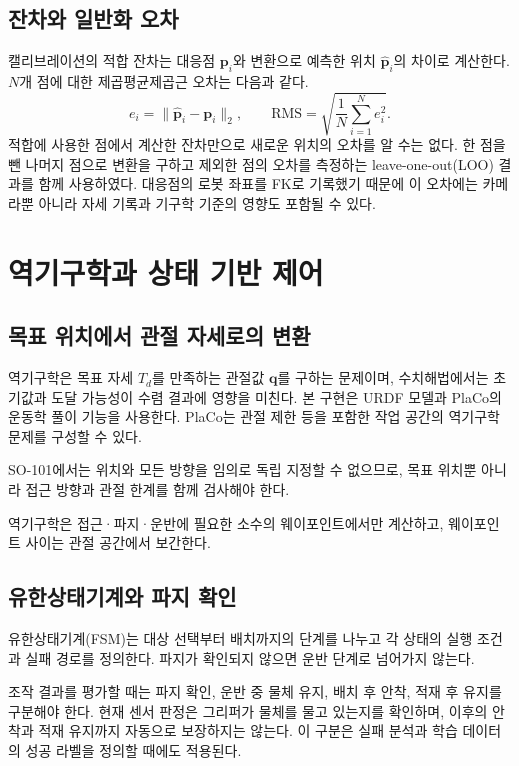 \subsection{잔차와 일반화 오차}
캘리브레이션의 적합 잔차는 대응점 $\boldsymbol{p}_i$와 변환으로 예측한 위치 $\hat{\boldsymbol{p}}_i$의 차이로 계산한다. $N$개 점에 대한 제곱평균제곱근 오차는 다음과 같다.
\begin{equation}
 e_i=\|\hat{\boldsymbol{p}}_i-\boldsymbol{p}_i\|_2,\qquad
 \mathrm{RMS}=\sqrt{\frac{1}{N}\sum_{i=1}^{N} e_i^2}.
\end{equation}
적합에 사용한 점에서 계산한 잔차만으로 새로운 위치의 오차를 알 수는 없다. 한 점을 뺀 나머지 점으로 변환을 구하고 제외한 점의 오차를 측정하는 leave-one-out(LOO) 결과를 함께 사용하였다. 대응점의 로봇 좌표를 FK로 기록했기 때문에 이 오차에는 카메라뿐 아니라 자세 기록과 기구학 기준의 영향도 포함될 수 있다.

\section{역기구학과 상태 기반 제어}
\subsection{목표 위치에서 관절 자세로의 변환}
역기구학은 목표 자세 $T_d$를 만족하는 관절값 $\boldsymbol{q}$를 구하는 문제이며, 수치해법에서는 초기값과 도달 가능성이 수렴 결과에 영향을 미친다\cite{modern-robotics}. 본 구현은 URDF 모델과 PlaCo의 운동학 풀이 기능을 사용한다. PlaCo는 관절 제한 등을 포함한 작업 공간의 역기구학 문제를 구성할 수 있다\cite{placo}.

SO-101에서는 위치와 모든 방향을 임의로 독립 지정할 수 없으므로, 목표 위치뿐 아니라 접근 방향과 관절 한계를 함께 검사해야 한다.

역기구학은 접근·파지·운반에 필요한 소수의 웨이포인트에서만 계산하고, 웨이포인트 사이는 관절 공간에서 보간한다.

\subsection{유한상태기계와 파지 확인}
유한상태기계(FSM)는 대상 선택부터 배치까지의 단계를 나누고 각 상태의 실행 조건과 실패 경로를 정의한다. 파지가 확인되지 않으면 운반 단계로 넘어가지 않는다.

조작 결과를 평가할 때는 파지 확인, 운반 중 물체 유지, 배치 후 안착, 적재 후 유지를 구분해야 한다. 현재 센서 판정은 그리퍼가 물체를 물고 있는지를 확인하며, 이후의 안착과 적재 유지까지 자동으로 보장하지는 않는다. 이 구분은 실패 분석과 학습 데이터의 성공 라벨을 정의할 때에도 적용된다.

\FloatBarrier
